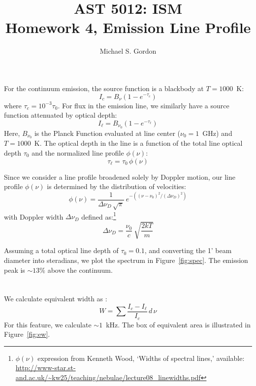 \documentclass[12pt]{article}
\begin{document}
\title{AST 5012: ISM \\ \vspace{2 mm}\Large Homework 4, Emission Line Profile}
\author{Michael S. Gordon}
\maketitle

\section{}
For the continuum emission, the source function is a blackbody at $T = 1000$~K:
\begin{equation*}
I_c = B_\nu\left(1-e^{-\tau_c}\right)
\end{equation*}
where $\tau_c = 10^{-3}\tau_0$.  For flux in the emission line, we similarly have a source function attenuated by optical depth:
\begin{equation*}
I_\ell = B_{\nu_0}\left(1-e^{-\tau_\ell}\right)
\end{equation*}
Here, $B_{\nu_0}$ is the Planck Function evaluated at line center ($\nu_0 = 1$~GHz) and $T = 1000$~K.  The optical depth in the line is a function of the total line optical depth $\tau_0$ and the normalized line profile $\phi(\nu)$:
\begin{equation*}
\tau_\ell = \tau_0\,\phi(\nu)
\end{equation*}

Since we consider a line profile broadened solely by Doppler motion, our line profile $\phi(\nu)$ is determined by the distribution of velocities:
\begin{equation*}
\phi(\nu) = \frac{1}{\Delta\nu_D\,\sqrt{\pi}}\:e^{-\left(\left(\nu-\nu_0\right)^2/\left(\Delta\nu_D\right)^2\right)}
\end{equation*}
with Doppler width $\Delta\nu_D$ defined as:\footnote{$\phi(\nu)$ expression from Kenneth Wood, \lq{}Widths of spectral lines,\rq{} available: \url{http://www-star.st-and.ac.uk/~kw25/teaching/nebulae/lecture08_linewidths.pdf}}
\begin{equation*}
\Delta\nu_D = \frac{\nu_0}{c}\:\sqrt{\frac{2kT}{m}}
\end{equation*}

Assuming a total optical line depth of $\tau_0 = 0.1$, and converting the 1\rq{} beam diameter into steradians, we plot the spectrum in Figure~\ref{fig:spec}. The emission peak is $\sim13\%$ above the continuum.
\figspec
\FloatBarrier

\section{}
We calculate equivalent width as :
\begin{equation*}
W = \sum{\frac{I_c-I_\ell}{I_c}\,d\,\nu}
\end{equation*}
For this feature, we calculate $\sim1$~kHz.  The box of equivalent area is illustrated in Figure~\ref{fig:ew}.
\figEW
\FloatBarrier
\end{document}
